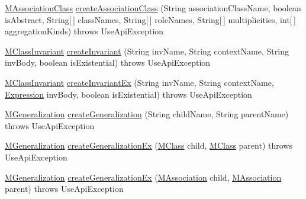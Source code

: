 \begin{DoxyCompactItemize}
\item 
\hyperlink{interfaceorg_1_1tzi_1_1use_1_1uml_1_1mm_1_1_m_association_class}{M\-Association\-Class} \hyperlink{classorg_1_1tzi_1_1use_1_1api_1_1_use_model_api_a43c448add280911e213f30d5a6a6f3b7}{create\-Association\-Class} (String association\-Class\-Name, boolean is\-Abstract, String\mbox{[}$\,$\mbox{]} class\-Names, String\mbox{[}$\,$\mbox{]} role\-Names, String\mbox{[}$\,$\mbox{]} multiplicities, int\mbox{[}$\,$\mbox{]} aggregation\-Kinds)  throws Use\-Api\-Exception 
\item 
\hyperlink{classorg_1_1tzi_1_1use_1_1uml_1_1mm_1_1_m_class_invariant}{M\-Class\-Invariant} \hyperlink{classorg_1_1tzi_1_1use_1_1api_1_1_use_model_api_a3d03ad8af8b6f01111371b8c9b186eaa}{create\-Invariant} (String inv\-Name, String context\-Name, String inv\-Body, boolean is\-Existential)  throws Use\-Api\-Exception 
\item 
\hyperlink{classorg_1_1tzi_1_1use_1_1uml_1_1mm_1_1_m_class_invariant}{M\-Class\-Invariant} \hyperlink{classorg_1_1tzi_1_1use_1_1api_1_1_use_model_api_a92e0c5923197ab5969cfe67a49770930}{create\-Invariant\-Ex} (String inv\-Name, String context\-Name, \hyperlink{classorg_1_1tzi_1_1use_1_1uml_1_1ocl_1_1expr_1_1_expression}{Expression} inv\-Body, boolean is\-Existential)  throws Use\-Api\-Exception 
\item 
\hyperlink{classorg_1_1tzi_1_1use_1_1uml_1_1mm_1_1_m_generalization}{M\-Generalization} \hyperlink{classorg_1_1tzi_1_1use_1_1api_1_1_use_model_api_a0eb4705f667bad5bb8e4f95c0986dfd1}{create\-Generalization} (String child\-Name, String parent\-Name)  throws Use\-Api\-Exception 
\item 
\hyperlink{classorg_1_1tzi_1_1use_1_1uml_1_1mm_1_1_m_generalization}{M\-Generalization} \hyperlink{classorg_1_1tzi_1_1use_1_1api_1_1_use_model_api_a37bd3bace1cfc2f08345612d898eb262}{create\-Generalization\-Ex} (\hyperlink{interfaceorg_1_1tzi_1_1use_1_1uml_1_1mm_1_1_m_class}{M\-Class} child, \hyperlink{interfaceorg_1_1tzi_1_1use_1_1uml_1_1mm_1_1_m_class}{M\-Class} parent)  throws Use\-Api\-Exception 
\item 
\hyperlink{classorg_1_1tzi_1_1use_1_1uml_1_1mm_1_1_m_generalization}{M\-Generalization} \hyperlink{classorg_1_1tzi_1_1use_1_1api_1_1_use_model_api_a29e1834d4bc34af14290ee0e7775ab71}{create\-Generalization\-Ex} (\hyperlink{interfaceorg_1_1tzi_1_1use_1_1uml_1_1mm_1_1_m_association}{M\-Association} child, \hyperlink{interfaceorg_1_1tzi_1_1use_1_1uml_1_1mm_1_1_m_association}{M\-Association} parent)  throws Use\-Api\-Exception 
\item 

\end{DoxyCompactItemize}
